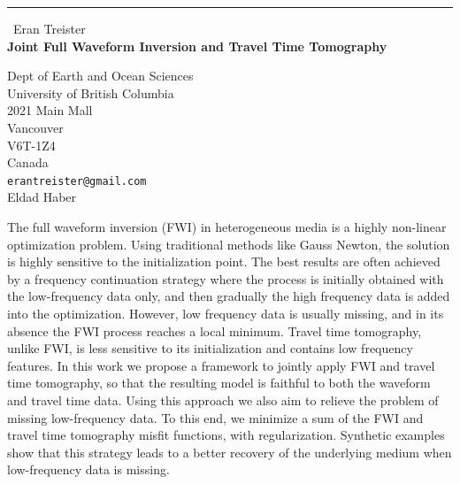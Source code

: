 \documentclass{report}
\begin{document}
\begin{center}
\rule{6in}{1pt} \
{\large Eran Treister \\
{\bf Joint Full Waveform Inversion and Travel Time Tomography}}

Dept of Earth and Ocean Sciences \\ University of British Columbia \\ 2021 Main Mall \\ Vancouver \\ V6T-1Z4 \\ Canada
\\
{\tt erantreister@gmail.com}\\
Eldad Haber\end{center}

The full waveform inversion (FWI) in heterogeneous media is a highly
non-linear optimization problem. Using traditional methods like Gauss
Newton, the solution is highly sensitive to the initialization point. The
best results are often achieved
by a frequency continuation strategy where the process is initially
obtained with the low-frequency data only, and then gradually the high
frequency data
is added into the optimization. However, low frequency data is usually
missing, and in its absence the FWI process reaches a local minimum.
Travel time tomography, unlike FWI, is less sensitive to its
initialization and contains low
frequency features. In this work we propose a framework to jointly apply
FWI and travel time tomography, so that the resulting model is faithful
to both the
waveform and travel time data. Using this approach we also aim to relieve
the problem of missing low-frequency data. To this end, we minimize a sum
of the FWI and travel time tomography misfit functions, with
regularization.
Synthetic examples show that this strategy leads to a better recovery of
the underlying medium when low-frequency data is missing.
\end{document}
